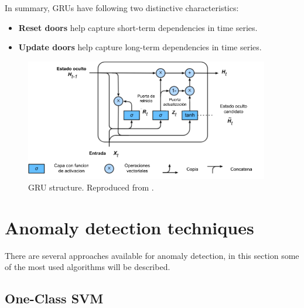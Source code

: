 \vspace{5mm} %

In summary, GRUs have following two distinctive characteristics:

\begin{itemize}
\item  \textbf{Reset doors} help capture short-term dependencies in time series.
\item  \textbf{Update doors} help capture long-term dependencies in time series.
\end{itemize}

\begin{figure}[h!]
  \begin{center}	\includegraphics[width=0.95\textwidth, frame]{imagenes/Cap4/gru}
  \caption{GRU structure. Reproduced from \protect\cite{Reference56}.} 
  \label{fig:gru}
  \end{center}
\end{figure}


\section{Anomaly detection techniques}

There are several approaches available for anomaly detection, in this section some of the most used algorithms will be described.

\subsection{One-Class SVM}

